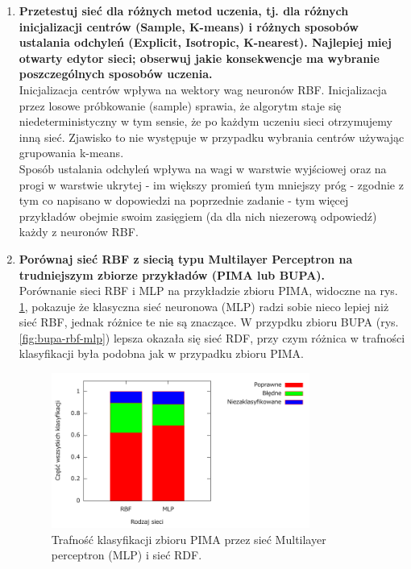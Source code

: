 \begin{enumerate}
\item \textbf{
Przetestuj sieć dla różnych metod uczenia, tj. dla różnych inicjalizacji centrów (Sample, K-means) i różnych sposobów ustalania odchyleń (Explicit, Isotropic, K-nearest). Najlepiej miej otwarty edytor sieci; obserwuj jakie konsekwencje ma wybranie poszczególnych sposobów uczenia.}
\\Inicjalizacja centrów wpływa na wektory wag neuronów RBF. Inicjalizacja przez losowe próbkowanie (sample) sprawia, że algorytm staje się niedeterministyczny w tym sensie, że po każdym uczeniu sieci otrzymujemy inną sieć. Zjawisko to nie występuje w przypadku wybrania centrów używając grupowania k-means.
\\Sposób ustalania odchyleń wpływa na wagi w warstwie wyjściowej oraz na progi w warstwie ukrytej - im większy promień tym mniejszy próg - zgodnie z tym co napisano w dopowiedzi na poprzednie zadanie - tym więcej przykładów obejmie swoim zasięgiem (da dla nich niezerową odpowiedź) każdy z neuronów RBF.

\item \textbf{
Porównaj sieć RBF z siecią typu Multilayer Perceptron na trudniejszym zbiorze przykładów (PIMA lub BUPA).}
\\Porównanie sieci RBF i MLP na przykładzie zbioru PIMA, widoczne na rys. \ref{fig:rbf-mlp}, pokazuje że klasyczna sieć neuronowa (MLP) radzi sobie nieco lepiej niż sieć RBF, jednak różnice te nie są znaczące. W przypdku zbioru BUPA (rys. \ref{fig:bupa-rbf-mlp}) lepsza okazała się sieć RDF, przy czym różnica w trafności klasyfikacji była podobna jak w przypadku zbioru PIMA.

\begin{figure}[h]
\centering
\includegraphics[width=0.8\textwidth]{dane/part1/zad11/rbf-mlp}
\caption{Trafność klasyfikacji zbioru PIMA przez sieć Multilayer perceptron (MLP) i sieć RDF.\label{fig:rbf-mlp}}
\end{figure}


\end{enumerate}
